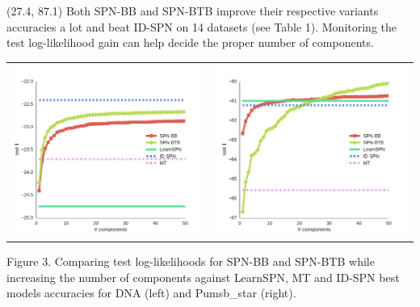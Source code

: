 \documentclass[final]{beamer}
\begin{document}
\begin{frame}{}
  \begin{textblock}{25.2}(27.4, 87.1)
    \footnotesize
    Both \textsf{SPN-BB} and \textsf{SPN-BTB} improve their respective
    variants accuracies a lot and beat \textsf{ID-SPN} on 14 datasets
    (see Table 1). Monitoring the test log-likelihood gain can help
    decide the proper number of components.
    \begin{table}[ht]
      \setlength{\tabcolsep}{30pt}  
      \centering
      \begin{tabular}{c c}
        \includegraphics[width=0.4\linewidth]{figures/curves/pumsb-star.pdf}&\includegraphics[width=0.4\linewidth]{figures/curves/dna.pdf}
      \end{tabular}
    \end{table}
    \vspace{-20pt}
    \begin{center}
      \begin{minipage}[t]{0.9\linewidth}
        \tiny\flushleft
        Figure 3. Comparing test log-likelihoods for \textsf{SPN-BB} and
        \textsf{SPN-BTB} while increasing the number of components against \textsf{LearnSPN}, \textsf{MT} and
        \textsf{ID-SPN} best models accuracies for DNA (left) and
        Pumsb\_star (right).
      \end{minipage}
    \end{center}
  \end{textblock}
  
  

\end{frame}
\end{document}
